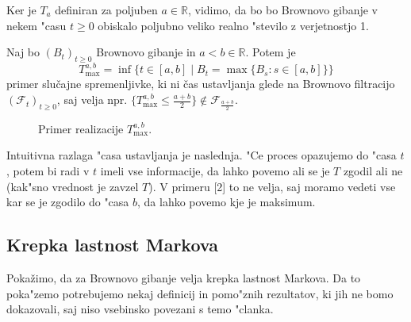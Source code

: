 \documentclass[twoside,11pt]{article}
\begin{document}
\begin{opomba}
    Ker je $T_a$ definiran za poljuben $a \in \mathbb{R}$, vidimo, da bo bo Brownovo gibanje v nekem "casu  $t\geq 0$ obiskalo poljubno veliko realno "stevilo z verjetnostjo 1.
\end{opomba}

\begin{primer}
    Naj bo $(B_t)_{t\geq0}$ Brownovo gibanje in $a < b \in \mathbb{R}$. Potem je
    $$
        T^{a, b}_{\max} = \inf\{t \in [a, b] \mid B_t =\max\{B_s: s\in [a, b]\} \}
    $$
    primer slučajne spremenljivke, ki ni čas ustavljanja glede na Brownovo filtracijo $(\mathcal{F}_t)_{t\geq0}$, saj velja npr. $\{T^{a, b}_{\max} \leq \tfrac{a+b}{2}\} \not\in \mathcal{F}_{\tfrac{a+b}{2}}$.
\end{primer}



\begin{figure}[h]
    \centering
    \caption{Primer realizacije $T^{a,b}_{\max}$.}
    \label{fig:slika4}
\end{figure}

Intuitivna razlaga "casa ustavljanja je naslednja. "Ce proces opazujemo do "casa $t$, potem bi radi v $t$ imeli vse informacije, da lahko povemo
ali se je $T$ zgodil ali ne (kak"sno vrednost je zavzel $T$). V primeru [2] to ne velja, saj moramo vedeti vse kar se je zgodilo do "casa $b$, da lahko povemo kje je maksimum. 

\subsection{Krepka lastnost Markova}
Pokažimo, da za Brownovo gibanje velja krepka lastnost Markova. Da to poka"zemo potrebujemo nekaj definicij in pomo"znih rezultatov, ki jih ne bomo dokazovali, saj niso vsebinsko povezani s temo "clanka.
\end{document}
